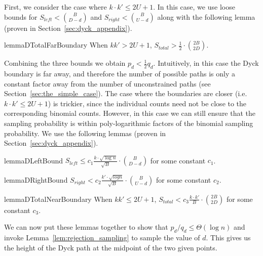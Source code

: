 First, we consider the case where $k\cdot k'\le 2U+1$.
In this case, we use loose bounds for $S_{left} < \binom{B}{D-d}$ and $S_{right} < \binom{B}{U-d}$
along with the following lemma (proven in Section~\ref{sec:dyck_appendix}).
\begin{restatable}{lemma}{DTotalFarBoundary}
\label{lem:DTotalFarBoundary}
When $kk' > 2U + 1$, $S_{total} > \frac 12\cdot \binom{2B}{2D}$.
\end{restatable}

Combining the three bounds we obtain $p_d < \frac 12 q_d$.
Intuitively, in this case the Dyck boundary is far away, and therefore the number of possible paths
is only a constant factor away from the number of unconstrained paths (see Section~\ref{sec:the_simple_case}).
The case where the boundaries are closer (i.e. $k\cdot k' \le 2U+1$) is trickier,
since the individual counts need not be close to the corresponding binomial counts.
However, in this case we can still ensure that the sampling probability is within poly-logarithmic factors of the binomial sampling probability.
We use the following lemmas (proven in Section~\ref{sec:dyck_appendix}).

\begin{restatable}{lemma}{DLeftBound}
\label{lem:DLeftBound}
$S_{left} \le c_1 \frac{ k\cdot\sqrt{\log n}}{\sqrt{B}}\cdot{{B}\choose{D-d}}$ for some constant $c_1$.
\end{restatable}

\begin{restatable}{lemma}{DRightBound}
\label{lem:DRightBound}
$S_{right} < c_2 \frac{k'\cdot \sqrt{log n}}{\sqrt{B}}\cdot{{B}\choose{U-d}}$ for some constant $c_2$.
\end{restatable}

\begin{restatable}{lemma}{DTotalNearBoundary}
\label{lem:DTotalNearBoundary}
When $kk' \le 2U + 1$, $S_{total} < c_3 \frac{k\cdot k'}{B}\cdot{{2B}\choose{2D}}$ for some constant $c_3$.
\end{restatable}

We can now put these lemmas together to show that $p_d/q_d \le \Theta(\log n)$ and invoke Lemma~\ref{lem:rejection_sampling} to sample the value of $d$.
This gives us the height of the Dyck path at the midpoint of the two given points.

